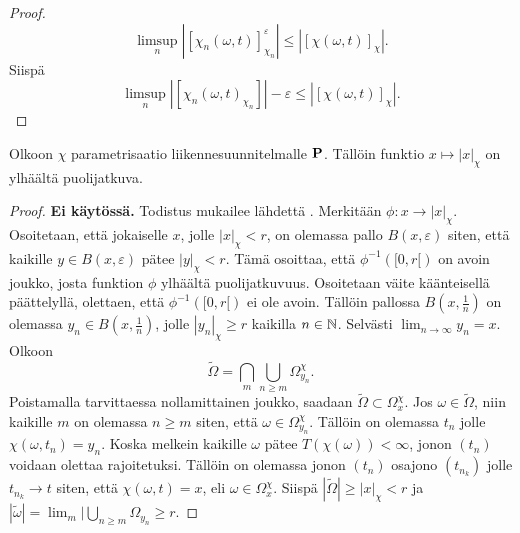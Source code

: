 \begin{proof}
    \begin{equation*}
        \limsup_n |[\chi_n(\omega, t)]_{\chi_n}^\varepsilon| \le |[\chi(\omega, t)]_\chi|.
    \end{equation*}
    Siispä
    \begin{equation*}
        \limsup_n |[\chi_n(\omega, t)_{\chi_n}]| - \varepsilon \le |[\chi(\omega, t)]_\chi|.
    \end{equation*}
\end{proof}
\begin{lemma}\label{le:multiplicityUSC}
    Olkoon $\chi$ parametrisaatio liikennesuunnitelmalle $\P$. Tällöin funktio $x \mapsto |x|_\chi$ on ylhäältä puolijatkuva.
\end{lemma}
\begin{proof}
    \textbf{Ei käytössä.}
    Todistus mukailee lähdettä \cite[p. 32]{OptimalTransportationNetworks}. Merkitään $\phi: x \to |x|_\chi$. Osoitetaan, että jokaiselle $x$, jolle $|x|_\chi < r$, on olemassa pallo $B(x, \varepsilon)$ siten, että kaikille $y \in B(x, \varepsilon)$ pätee $|y|_\chi < r$. Tämä osoittaa, että $\phi^{-1}([0, r[)$ on avoin joukko, josta  funktion $\phi$ ylhäältä puolijatkuvuus. Osoitetaan väite käänteisellä päättelyllä, olettaen, että $\phi^{-1}([0, r[)$ ei ole avoin. Tällöin pallossa $B(x, \frac{1}{n})$ on olemassa $y_n \in B(x, \frac{1}{n})$, jolle $|y_n|_\chi \ge r$ kaikilla $n\in \N$. Selvästi $\lim_{n\to\infty} y_n = x$. Olkoon
    \begin{equation*}
        \tilde{\Omega} = \bigcap_m \bigcup_{n \ge m} \Omega_{y_n}^\chi.
    \end{equation*}
    Poistamalla tarvittaessa nollamittainen joukko, saadaan $\tilde{\Omega} \subset \Omega_x^\chi$. Jos $\omega \in \tilde{\Omega}$, niin kaikille $m$ on olemassa $n \ge m$ siten, että $\omega \in \Omega_{y_n}^\chi$. Tällöin on olemassa $t_n$ jolle $\chi(\omega, t_n) = y_n$. 
    Koska melkein kaikille $\omega$ pätee $T(\chi(\omega)) < \infty$, jonon $(t_n)$ voidaan olettaa rajoitetuksi. Tällöin on olemassa jonon $(t_n)$ osajono $(t_{n_k})$ jolle $t_{n_k} \to t$ siten, että $\chi(\omega, t) = x$, eli $\omega \in \Omega_x^\chi$. Siispä $|\tilde{\Omega}| \ge |x|_\chi < r$ ja $|\tilde{\omega}| = \lim_m |\bigcup_{n \ge m} \Omega_{y_n} \ge r$.
\end{proof}

